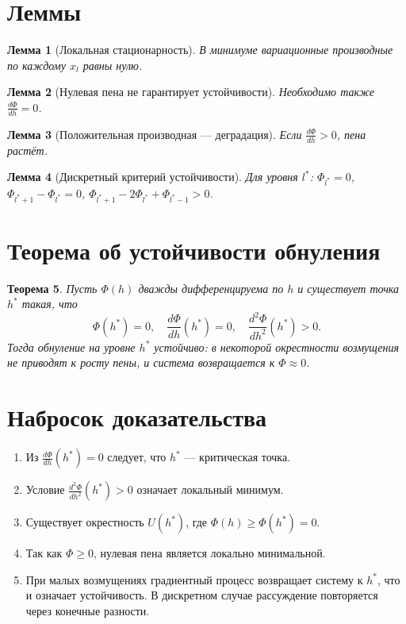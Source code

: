 \documentclass[11pt,a4paper]{article}
\newtheorem{theorem}{Теорема}
\newtheorem{lemma}[theorem]{Лемма}
\begin{document}
\section{Леммы}

\begin{lemma}[Локальная стационарность]
В минимуме вариационные производные по каждому $x_l$ равны нулю.
\end{lemma}

\begin{lemma}[Нулевая пена не гарантирует устойчивости]
Необходимо также $\frac{d\Phi}{dh} = 0$.
\end{lemma}

\begin{lemma}[Положительная производная --- деградация]
Если $\frac{d\Phi}{dh} > 0$, пена растёт.
\end{lemma}

\begin{lemma}[Дискретный критерий устойчивости]
Для уровня $l^*$: $\Phi_{l^*} = 0$, $\Phi_{l^*+1} - \Phi_{l^*} = 0$, $\Phi_{l^*+1} - 2\Phi_{l^*} + \Phi_{l^*-1} > 0$.
\end{lemma}

\section{Теорема об устойчивости обнуления}

\begin{theorem}
Пусть $\Phi(h)$ дважды дифференцируема по $h$ и существует точка $h^*$ такая, что
\begin{equation}
\Phi(h^*) = 0, \quad \frac{d\Phi}{dh}(h^*) = 0, \quad \frac{d^2\Phi}{dh^2}(h^*) > 0.
\label{eq:stability-conditions}
\end{equation}
Тогда обнуление на уровне $h^*$ устойчиво: в некоторой окрестности возмущения не приводят к росту пены, и система возвращается к $\Phi \approx 0$.
\end{theorem}

\section{Набросок доказательства}

\begin{enumerate}
    \item Из $\frac{d\Phi}{dh}(h^*) = 0$ следует, что $h^*$ --- критическая точка.
    \item Условие $\frac{d^2\Phi}{dh^2}(h^*) > 0$ означает локальный минимум.
    \item Существует окрестность $U(h^*)$, где $\Phi(h) \geq \Phi(h^*) = 0$.
    \item Так как $\Phi \geq 0$, нулевая пена является локально минимальной.
    \item При малых возмущениях градиентный процесс возвращает систему к $h^*$, что и означает устойчивость. В дискретном случае рассуждение повторяется через конечные разности.
\end{enumerate}
\end{document}
